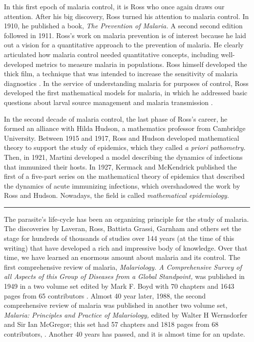 \documentclass[
]{book}
\begin{document}
In this first epoch of malaria control, it is Ross who once again draws our attention.
After his big discovery, Ross turned his attention to malaria control. In 1910,
he published a book, \emph{The Prevention of Malaria.} A second second edition followed in 1911.
Ross's work on malaria prevention is of interest because he laid out a vision for a quantitative approach to the prevention of malaria.
He clearly articulated how malaria control needed quantitative concepts, including well-developed metrics to measure malaria in populations.
Ross himself developed the thick film, a technique that was intended to increase the sensitivity of malaria diagnostics \autocite{RossR1903ThickFilm,RossR1903ImprovedMethod}.
In the service of understanding malaria for purposes of control, Ross developed the first mathematical models for malaria, in which he addressed basic questions about larval source management \autocite{RossR1905LogicalBasis} and malaria transmission \autocite{RossR1908,RossR1911Book,RossR1911Nature}.

In the second decade of malaria control, the last phase of Ross's career, he formed an alliance with Hilda Hudson, a mathematics professor from Cambridge University. Between 1915 and 1917, Ross and Hudson developed mathematical theory to support the study of epidemics, which they called \emph{a priori pathometry.} Then, in 1921, Martini developed a model describing the dynamics of infections that immunized their hosts. In 1927, Kermack and McKendrick published the first of a five-part series on the mathematical theory of epidemics that described the dynamics of acute immunizing infections, which overshadowed the work by Ross and Hudson. Nowadays, the field is called \emph{mathematical epidemiology.}

\begin{center}\rule{0.5\linewidth}{0.5pt}\end{center}

The parasite's life-cycle has been an organizing principle for the study of malaria.
The discoveries by Laveran, Ross, Battista Grassi, Garnham and others set the stage for hundreds of thousands of studies over 144 years (at the time of this writing) that have developed a rich and impressive body of knowledge.
Over that time, we have learned an enormous amount about malaria and its control.
The first comprehensive review of malaria, \emph{Malariology. A Comprehensive Survey of all Aspects of this Group of Diseases from a Global Standpoint,} was published in 1949 in a two volume set edited by Mark F. Boyd with
70 chapters and 1643 pages from 65 contributors \autocite{BoydMF1949MalariologyComprehensive}.
Almost 40 year later, 1988, the second comprehensive review of malaria was published in another two volume set, \emph{Malaria: Principles and Practice of Malariology,}
edited by Walter H Wernsdorfer and Sir Ian McGregor; this set had 57 chapters and 1818 pages from 68 contributors, \autocite{WernsdorferWH1988MalariaPrinciples}.
Another 40 years has passed, and it is almost time for an update.
\end{document}
